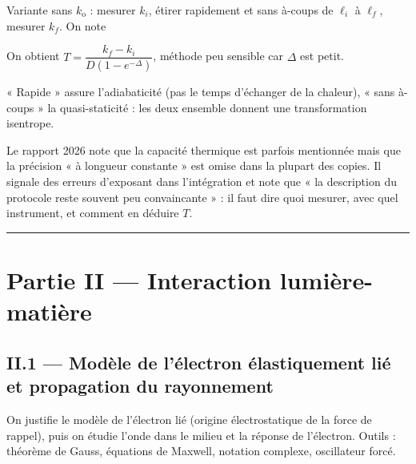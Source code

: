 \documentclass[11pt,a4paper]{article}
\newcommand{\equationajustee}[1]{%
  \sbox{\boiteequation}{$\displaystyle #1$}%
  \ifdim\wd\boiteequation>\linewidth
    \[\resizebox{\linewidth}{!}{\usebox{\boiteequation}}\]%
  \else
    \[#1\]%
  \fi}
\begin{document}
Variante sans \(k_{\mathrm{o}}\) : mesurer \(k_i\), étirer rapidement et sans à-coups de \(\ell_i\) à \(\ell_f\), mesurer \(k_f\). On note

\equationajustee{\Delta=\frac{D}{2C_\ell}\left[(\ell_f-\ell_{\mathrm{o}})^2-(\ell_i-\ell_{\mathrm{o}})^2\right]}

On obtient \(T=\dfrac{k_f-k_i}{D(1-e^{-\Delta})}\), méthode peu sensible car \(\Delta\) est petit.

\begin{methode}

« Rapide » assure l'adiabaticité (pas le temps d'échanger de la chaleur), « sans à-coups » la quasi-staticité : les deux ensemble donnent une transformation isentrope.

\end{methode}

\begin{jury}

Le rapport 2026 note que la capacité thermique est parfois mentionnée mais que la précision « à longueur constante » est omise dans la plupart des copies. Il signale des erreurs d'exposant dans l'intégration et note que « la description du protocole reste souvent peu convaincante » : il faut dire quoi mesurer, avec quel instrument, et comment en déduire \(T\).

\end{jury}

\begin{center}\rule{0.5\linewidth}{0.5pt}\end{center}

\hypertarget{partie-ii-interaction-lumiuxe8re-matiuxe8re}{%
\section{Partie II --- Interaction lumière-matière}\label{partie-ii-interaction-lumiuxe8re-matiuxe8re}}

\hypertarget{ii.1-moduxe8le-de-luxe9lectron-uxe9lastiquement-liuxe9-et-propagation-du-rayonnement}{%
\subsection{II.1 --- Modèle de l'électron élastiquement lié et propagation du rayonnement}\label{ii.1-moduxe8le-de-luxe9lectron-uxe9lastiquement-liuxe9-et-propagation-du-rayonnement}}

On justifie le modèle de l'électron lié (origine électrostatique de la force de rappel), puis on étudie l'onde dans le milieu et la réponse de l'électron. Outils : théorème de Gauss, équations de Maxwell, notation complexe, oscillateur forcé.
\end{document}
